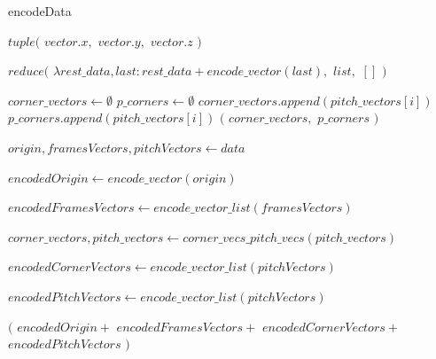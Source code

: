 \documentclass[
11pt,
twoside
]{report}
\begin{document}
\begin{algorithm}
\begin{algorithmic}


\caption{encodeData}\label{alg:cap}

    \Return $tuple($
        \State \indent $vector.x,$
        \State \indent $vector.y,$
        \State \indent $vector.z$
    \State $)$
\EndProcedure

    \Return $reduce($
        \State \indent $\lambda rest\_data, last: rest\_data + encode\_vector(last),$
        \State \indent $list,$
        \State \indent $[]$ 
    \State $)$
\EndProcedure


    \State $corner\_vectors \gets \emptyset$
    \State $p\_corners \gets \emptyset$
            \State $corner\_vectors.append(pitch\_vectors[i])$
        \Else
            \State $p\_corners.append(pitch\_vectors[i])$
        \EndIf
    \EndFor
    \State
    \Return $($
        \State \indent $corner\_vectors,$
        \State \indent $p\_corners$
    \State $)$
\EndProcedure

\State

    \State $origin, framesVectors, pitchVectors \gets data$

    \State

    \State $encodedOrigin \gets encode\_vector(origin)$

    \State $encodedFramesVectors \gets encode\_vector\_list(framesVectors)$

    \State $corner\_vectors, pitch\_vectors \gets corner\_vecs\_pitch\_vecs(pitch\_vectors)$

    \State $encodedCornerVectors \gets encode\_vector\_list(pitchVectors)$

    \State $encodedPitchVectors \gets encode\_vector\_list(pitchVectors)$

    \Return $($
        \State \indent $encodedOrigin +$
        \State \indent $encodedFramesVectors +$
        \State \indent $encodedCornerVectors +$
        \State \indent $encodedPitchVectors$
    \State $)$
\EndProcedure

\end{algorithmic}
\end{algorithm}
\end{document}
